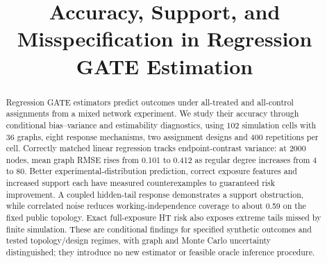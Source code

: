 \documentclass{article}
\title{Accuracy, Support, and Misspecification in Regression GATE Estimation}
\author{}
\begin{document}
\maketitle
\begin{abstract}
Regression GATE estimators predict outcomes under all-treated and all-control assignments from a mixed network experiment. We study their accuracy through conditional bias--variance and estimability diagnostics, using 102 simulation cells with 36 graphs, eight response mechanisms, two assignment designs and 400 repetitions per cell. Correctly matched linear regression tracks endpoint-contrast variance: at 2000 nodes, mean graph RMSE rises from 0.101 to 0.412 as regular degree increases from 4 to 80. Better experimental-distribution prediction, correct exposure features and increased support each have measured counterexamples to guaranteed risk improvement. A coupled hidden-tail response demonstrates a support obstruction, while correlated noise reduces working-independence coverage to about 0.59 on the fixed public topology. Exact full-exposure HT risk also exposes extreme tails missed by finite simulation. These are conditional findings for specified synthetic outcomes and tested topology/design regimes, with graph and Monte Carlo uncertainty distinguished; they introduce no new estimator or feasible oracle inference procedure.
\end{abstract}







\clearpage


\clearpage
\appendix





\clearpage

\end{document}
